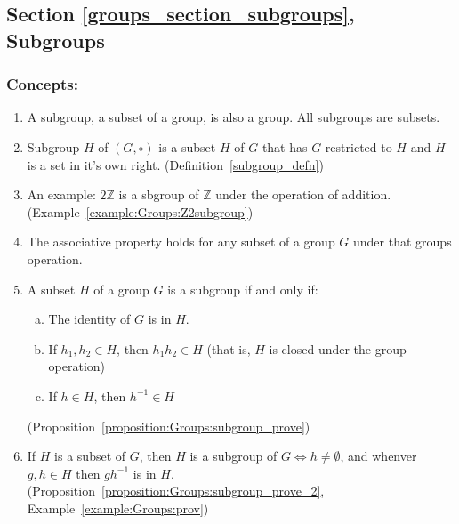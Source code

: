 \subsection*{Section \ref{groups_section_subgroups}, Subgroups}
\subsubsection*{Concepts:}
\begin{enumerate}
\item 
A subgroup, a subset of a group, is also a group. All subgroups are subsets.
	
\item
Subgroup $H$ of $(G, \circ)$ is a subset $H$ of $G$ that has $G$ restricted to $H$ and $H$ is a set in it's own right. (Definition~\ref{subgroup_defn})

\item
An example: $2{\mathbb Z}$ is a sbgroup of ${\mathbb Z}$ under the operation of addition.  (Example~\ref{example:Groups:Z2subgroup})

\item
The associative property holds for any subset of a group $G$ under that groups operation.

\item
A subset $H$ of a group $G$ is a subgroup if and only if:
	\begin{enumerate}[(a)]
	\item
	The identity of $G$ is in $H$.

	\item
	If $h_1, h_2 \in H$, then $h_1h_2 \in H$ (that is, $H$ is closed under the group operation)

	\item
	If $h \in H$, then $h^{-1} \in H$
	\end{enumerate}
(Proposition~\ref{proposition:Groups:subgroup_prove})

\item
If $H$ is a subset of $G$, then $H$ is a subgroup of $G \iff h \neq \emptyset$, and whenver $g, h \in H$ then $gh^{-1}$ is in $H$. (Proposition~\ref{proposition:Groups:subgroup_prove_2}, Example~\ref{example:Groups:prov})
\end{enumerate}

